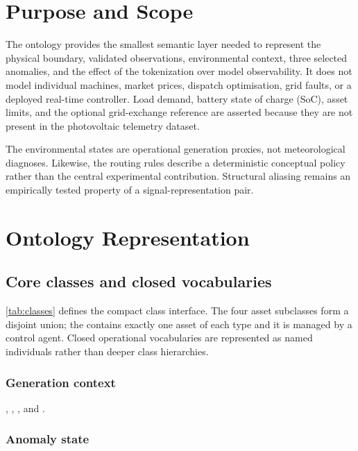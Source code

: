 \section{Purpose and Scope}

The ontology provides the smallest semantic layer needed to represent the physical boundary, validated observations, environmental context, three selected anomalies, and the effect of the tokenization over model observability. It does not model individual machines, market prices, dispatch optimisation, grid faults, or a deployed real-time controller. Load demand, battery state of charge (SoC), asset limits, and the optional grid-exchange reference are asserted because they are not present in the photovoltaic telemetry dataset.

The environmental states are operational generation proxies, not meteorological diagnoses. Likewise, the routing rules describe a deterministic conceptual policy rather than the central experimental contribution. Structural aliasing remains an empirically tested property of a signal-representation pair.

\section{Ontology Representation}

\subsection{Core classes and closed vocabularies}

\autoref{tab:classes} defines the compact class interface. The four asset subclasses form a disjoint union; the  contains exactly one asset of each type and it is managed by a control agent. Closed operational vocabularies are represented as named individuals rather than deeper class hierarchies.



\subsubsection{Generation context}

, , , and .

\subsubsection{Anomaly state}

